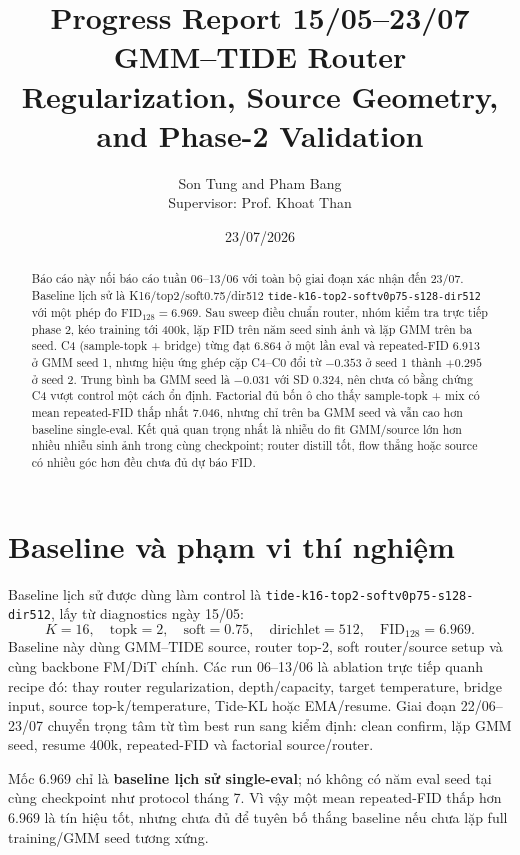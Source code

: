 \documentclass[11pt,a4paper]{article}
\title{\textbf{Progress Report 15/05--23/07}\\
\large GMM--TIDE Router Regularization, Source Geometry, and Phase-2 Validation}
\author{Son Tung and Pham Bang\\\small Supervisor: Prof. Khoat Than}
\date{23/07/2026}
\newcommand{\fid}{\mathrm{FID}}
\newcommand{\run}[1]{{\small\nolinkurl{#1}}}
\begin{document}
\maketitle

\begin{abstract}
Báo cáo này nối báo cáo tuần 06--13/06 với toàn bộ giai đoạn xác nhận đến 23/07. Baseline lịch sử là K16/top2/soft0.75/dir512 \run{tide-k16-top2-softv0p75-s128-dir512} với một phép đo \(\fid_{128}=6.969\). Sau sweep điều chuẩn router, nhóm kiểm tra trực tiếp phase 2, kéo training tới 400k, lặp FID trên năm seed sinh ảnh và lặp GMM trên ba seed. C4 (sample-topk + bridge) từng đạt 6.864 ở một lần eval và repeated-FID 6.913 ở GMM seed 1, nhưng hiệu ứng ghép cặp C4--C0 đổi từ \(-0.353\) ở seed 1 thành \(+0.295\) ở seed 2. Trung bình ba GMM seed là \(-0.031\) với SD 0.324, nên chưa có bằng chứng C4 vượt control một cách ổn định. Factorial đủ bốn ô cho thấy sample-topk + mix có mean repeated-FID thấp nhất \(7.046\), nhưng chỉ trên ba GMM seed và vẫn cao hơn baseline single-eval. Kết quả quan trọng nhất là nhiễu do fit GMM/source lớn hơn nhiều nhiễu sinh ảnh trong cùng checkpoint; router distill tốt, flow thẳng hoặc source có nhiều góc hơn đều chưa đủ dự báo FID.
\end{abstract}

\section{Baseline và phạm vi thí nghiệm}

Baseline lịch sử được dùng làm control là \run{tide-k16-top2-softv0p75-s128-dir512}, lấy từ diagnostics ngày 15/05:
\[
  K=16,\quad \mathrm{topk}=2,\quad \mathrm{soft}=0.75,\quad \mathrm{dirichlet}=512,\quad \fid_{128}=6.969.
\]
Baseline này dùng GMM--TIDE source, router top-2, soft router/source setup và cùng backbone FM/DiT chính. Các run 06--13/06 là ablation trực tiếp quanh recipe đó: thay router regularization, depth/capacity, target temperature, bridge input, source top-k/temperature, Tide-KL hoặc EMA/resume. Giai đoạn 22/06--23/07 chuyển trọng tâm từ tìm best run sang kiểm định: clean confirm, lặp GMM seed, resume 400k, repeated-FID và factorial source/router.

Mốc 6.969 chỉ là \textbf{baseline lịch sử single-eval}; nó không có năm eval seed tại cùng checkpoint như protocol tháng 7. Vì vậy một mean repeated-FID thấp hơn 6.969 là tín hiệu tốt, nhưng chưa đủ để tuyên bố thắng baseline nếu chưa lặp full training/GMM seed tương xứng.
\end{document}
